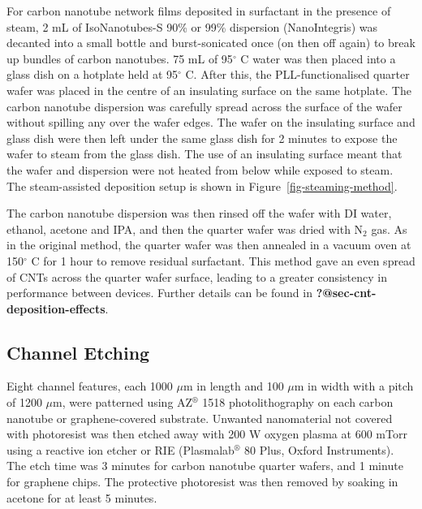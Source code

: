 \documentclass[
  a4paper,
]{scrbook}
\begin{document}
For carbon nanotube network films deposited in surfactant in the
presence of steam, 2 mL of IsoNanotubes-S 90\% or 99\% dispersion
(NanoIntegris) was decanted into a small bottle and burst-sonicated once
(on then off again) to break up bundles of carbon nanotubes. 75 mL of
95\(^\circ\) C water was then placed into a glass dish on a hotplate
held at 95\(^\circ\) C. After this, the PLL-functionalised quarter wafer
was placed in the centre of an insulating surface on the same hotplate.
The carbon nanotube dispersion was carefully spread across the surface
of the wafer without spilling any over the wafer edges. The wafer on the
insulating surface and glass dish were then left under the same glass
dish for 2 minutes to expose the wafer to steam from the glass dish. The
use of an insulating surface meant that the wafer and dispersion were
not heated from below while exposed to steam. The steam-assisted
deposition setup is shown in Figure~\ref{fig-steaming-method}.

The carbon nanotube dispersion was then rinsed off the wafer with DI
water, ethanol, acetone and IPA, and then the quarter wafer was dried
with N\(_2\) gas. As in the original method, the quarter wafer was then
annealed in a vacuum oven at 150\(^\circ\) C for 1 hour to remove
residual surfactant. This method gave an even spread of CNTs across the
quarter wafer surface, leading to a greater consistency in performance
between devices. Further details can be found in
\textbf{?@sec-cnt-deposition-effects}.

\hypertarget{channel-etching}{%
\subsection{Channel Etching}\label{channel-etching}}

Eight channel features, each 1000 \(\mu\)m in length and 100 \(\mu\)m in
width with a pitch of 1200 \(\mu\)m, were patterned using
AZ\(^\circledR\) 1518 photolithography on each carbon nanotube or
graphene-covered substrate. Unwanted nanomaterial not covered with
photoresist was then etched away with 200 W oxygen plasma at 600 mTorr
using a reactive ion etcher or RIE (Plasmalab\(^\circledR\) 80 Plus,
Oxford Instruments). The etch time was 3 minutes for carbon nanotube
quarter wafers, and 1 minute for graphene chips. The protective
photoresist was then removed by soaking in acetone for at least 5
minutes.
\end{document}
